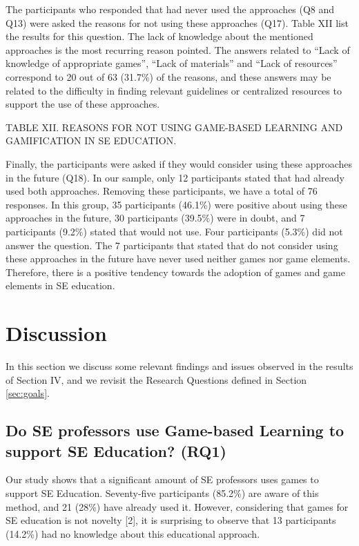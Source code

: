 The participants who responded that had never used the approaches (Q8 and Q13) were asked the reasons for not using these approaches (Q17). Table XII list the results for this question. The lack of knowledge about the mentioned approaches is the most recurring reason pointed. The answers related to “Lack of knowledge of appropriate games”, “Lack of materials” and “Lack of resources” correspond to 20 out of 63 (31.7\%) of the reasons, and these answers may be related to the difficulty in finding relevant guidelines or centralized resources to support the use of these approaches.

TABLE XII. REASONS FOR NOT USING GAME-BASED LEARNING AND GAMIFICATION IN SE EDUCATION.

Finally, the participants were asked if they would consider using these approaches in the future (Q18). In our sample, only 12 participants stated that had already used both approaches. Removing these participants, we have a total of 76 responses. In this group, 35 participants (46.1\%) were positive about using these approaches in the future, 30 participants (39.5\%) were in doubt, and 7 participants (9.2\%) stated that would not use. Four participants (5.3\%) did not answer the question. The 7 participants that stated that do not consider using these approaches in the future have never used neither games nor game elements. Therefore, there is a positive tendency towards the adoption of games and game elements in SE education.

\section{Discussion}
\label{sec:discussion}

In this section we discuss some relevant findings and issues observed in the results of Section IV, and we revisit the Research Questions defined in Section \ref{sec:goals}.

\subsection{Do SE professors use Game-based Learning to support SE Education? (RQ1)}

Our study shows that a significant amount of SE professors uses games to support SE Education. Seventy-five participants (85.2\%) are aware of this method, and 21 (28\%) have already used it. However, considering that games for SE education is not novelty [2], it is surprising to observe that 13 participants (14.2\%) had no knowledge about this educational approach.

